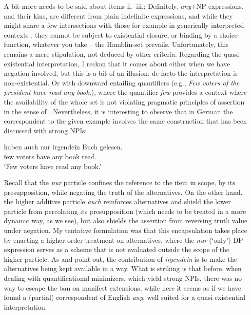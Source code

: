 \documentclass[output=paper,colorlinks,citecolor=brown,
]{langscibook}
\begin{document}
A bit more needs to be said about items ii.--iii.: Definitely, \textit{any}+NP expressions, and their kins, are
different from plain indefinite expressions, and while they might share a few intersections with those for example in
generically interpreted contexts \citep[cf.][]{kadmonlandmann1993}, they cannot be subject to existential closure, or
binding by a choice-function, whatever you take -- the Hamblin-set prevails. Unfortunately, this remains a mere stipulation,
not deduced by other criteria. Regarding the quasi-existential interpretation, I reckon that it comes about either when
we have negation involved, but this is a bit of an illusion: de facto the interpretation is non-existential. Or with downward entailing quantifiers
(e.g., \textit{Few voters of the president have read any book.}), where the quantifier \textit{few} provides a context where
the availability of the whole set is not violating pragmatic principles of assertion in the sense of
\citet{krifka1995}. Nevertheless, it is interesting to observe that in German the correspondent to the given example
involves the same construction that has been discussed with strong NPIs:

\ea
   {haben} {auch nur irgendein} {Buch} {gelesen.}\\
       {few voters} have any book read.\\
  \glt `Few voters have read any book.'
\z

Recall that the \textit{nur} particle confines the reference to the item in scope, by its presupposition, while negating
the truth of the alternatives. On the other hand, the higher additive particle \textit{auch} reinforces alternatives and shield the
lower particle from percolating its presupposition (which needs to be treated in a more dynamic way, as we see), but
also shields the assertion from reversing truth value under negation. My tentative formulation was that this
encapsulation takes place by enacting a higher order treatment on alternatives, where the \textit{nur} (`only') DP
expression serves as a scheme that is not evaluated outside the scope of the higher particle. As
\citet{kratzershimo2002} and \citet{kratzer2005} point out, the contribution of \textit{irgendein} is to make the
alternatives being kept available in a way. What is striking is that before, when dealing with quantificational
minimizers, which yield strong NPIs, there was no way to escape the ban on manifest extensions, while here it seems
as if we have found a (partial) correspondent of English \textit{any}, well suited for a quasi-existential
interpretation.
\end{document}
